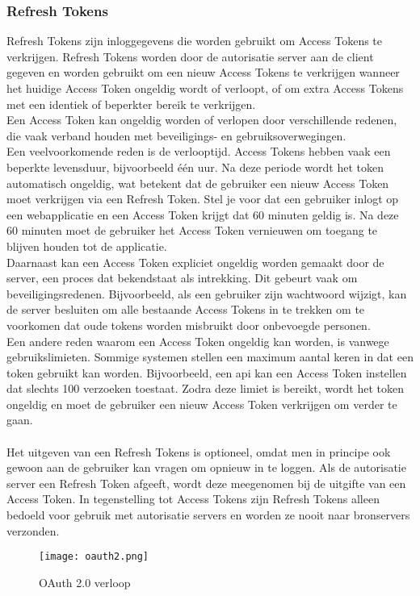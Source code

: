 \subsubsection{Refresh Tokens}%
\label{subsubsec:refresh-tokens}
Refresh Tokens zijn inloggegevens die worden gebruikt om Access Tokens te verkrijgen. Refresh Tokens worden door de autorisatie server aan de client
gegeven en worden gebruikt om een nieuw Access Tokens te verkrijgen wanneer het huidige Access Token ongeldig wordt of verloopt, of om extra Access
Tokens met een identiek of beperkter bereik te verkrijgen. 
\\
Een Access Token kan ongeldig worden of verlopen door verschillende redenen, die vaak verband houden met beveiligings- en gebruiksoverwegingen. 
\\
Een veelvoorkomende reden is de verlooptijd. Access Tokens hebben vaak een beperkte levensduur, bijvoorbeeld één uur. Na deze periode wordt het token
automatisch ongeldig, wat betekent dat de gebruiker een nieuw Access Token moet verkrijgen via een Refresh Token. Stel je voor dat een gebruiker inlogt 
op een webapplicatie en een Access Token krijgt dat 60 minuten geldig is. Na deze 60 minuten moet de gebruiker het Access Token vernieuwen om toegang
te blijven houden tot de applicatie.
\\
Daarnaast kan een Access Token expliciet ongeldig worden gemaakt door de server, een proces dat bekendstaat als intrekking. Dit gebeurt vaak om 
beveiligingsredenen. Bijvoorbeeld, als een gebruiker zijn wachtwoord wijzigt, kan de server besluiten om alle bestaande Access Tokens in te trekken 
om te voorkomen dat oude tokens worden misbruikt door onbevoegde personen.
\\
Een andere reden waarom een Access Token ongeldig kan worden, is vanwege gebruikslimieten. Sommige systemen stellen een maximum aantal keren in dat 
een token gebruikt kan worden. Bijvoorbeeld, een \gls{api} kan een Access Token instellen dat slechts 100 verzoeken toestaat. Zodra deze limiet is bereikt, 
wordt het token ongeldig en moet de gebruiker een nieuw Access Token verkrijgen om verder te gaan.
\\\\
Het uitgeven van een Refresh Tokens is optioneel, omdat men in principe ook gewoon aan de
gebruiker kan vragen om opnieuw in te loggen.
Als de autorisatie server een Refresh Token afgeeft, wordt deze meegenomen bij de uitgifte van een Access Token. In tegenstelling tot Access Tokens zijn 
Refresh Tokens alleen bedoeld voor gebruik met autorisatie servers en worden ze nooit naar bronservers verzonden.
\begin{figure}[h]
  \centering
  \texttt{[image: oauth2.png]}
  \caption{OAuth 2.0 verloop}\label{fig:example1}
\end{figure}

